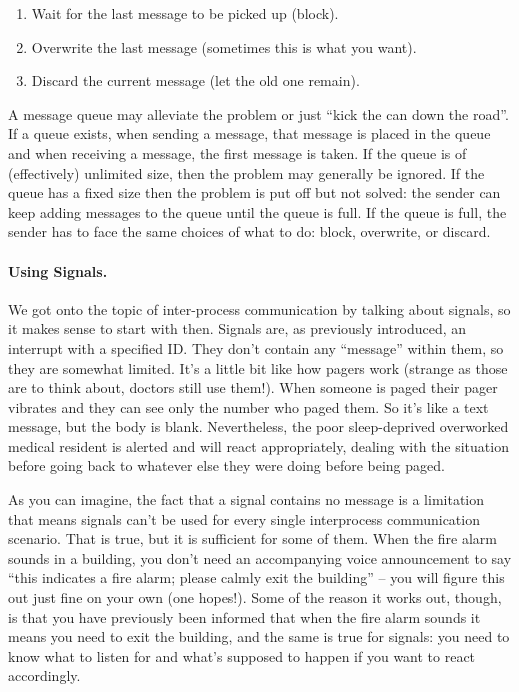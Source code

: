 \documentclass[a4paper]{report}
\begin{document}
\begin{enumerate}
	\item Wait for the last message to be picked up (block).
	\item Overwrite the last message (sometimes this is what you want).
	\item Discard the current message (let the old one remain).
\end{enumerate}

A message queue may alleviate the problem or just ``kick the can down the road''. If a queue exists, when sending a message, that message is placed in the queue and when receiving a message, the first message is taken. If the queue is of (effectively) unlimited size, then the problem may generally be ignored. If the queue has a fixed size then the problem is put off but not solved: the sender can keep adding messages to the queue until the queue is full. If the queue is full, the sender has to face the same choices of what to do: block, overwrite, or discard.

\paragraph{Using Signals.} We got onto the topic of inter-process communication by talking about signals, so it makes sense to start with then. Signals are, as previously introduced, an interrupt with a specified ID. They don't contain any ``message'' within them, so they are somewhat limited. It's a little bit like how pagers work (strange as those are to think about, doctors still use them!). When someone is paged their pager vibrates and they can see only the number who paged them. So it's like a text message, but the body is blank. Nevertheless, the poor sleep-deprived overworked medical resident is alerted and will react appropriately, dealing with the situation before going back to whatever else they were doing before being paged.

As you can imagine, the fact that a signal contains no message is a limitation that means signals can't be used for every single interprocess communication scenario. That is true, but it is sufficient for some of them. When the fire alarm sounds in a building, you don't need an accompanying voice announcement to say ``this indicates a fire alarm; please calmly exit the building'' -- you will figure this out just fine on your own (one hopes!). Some of the reason it works out, though, is that you have previously been informed that when the fire alarm sounds it means you need to exit the building, and the same is true for signals: you need to know what to listen for and what's supposed to happen if you want to react accordingly.
\end{document}
